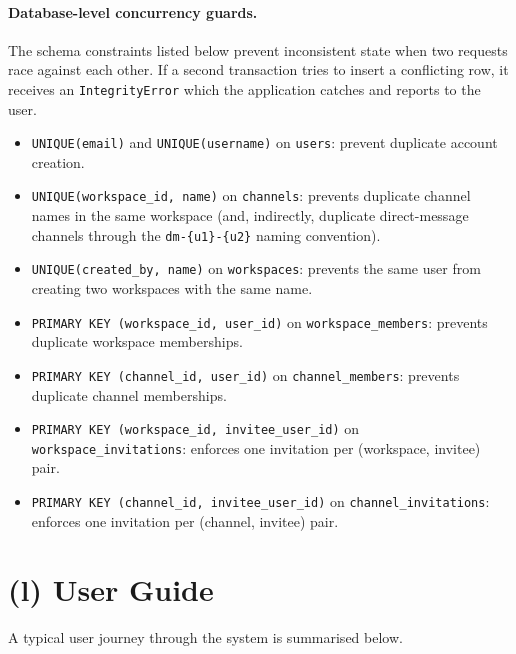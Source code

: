 \documentclass[11pt,letterpaper]{article}
\begin{document}
\paragraph{Database-level concurrency guards.} The schema constraints listed
below prevent inconsistent state when two requests race against each other.
If a second transaction tries to insert a conflicting row, it receives an
\texttt{IntegrityError} which the application catches and reports to the user.
\begin{itemize}[leftmargin=1.4em,itemsep=1pt]
  \item \texttt{UNIQUE(email)} and \texttt{UNIQUE(username)} on
        \texttt{users}: prevent duplicate account creation.
  \item \texttt{UNIQUE(workspace\_id, name)} on \texttt{channels}: prevents
        duplicate channel names in the same workspace (and, indirectly,
        duplicate direct-message channels through the
        \texttt{dm-\{u1\}-\{u2\}} naming convention).
  \item \texttt{UNIQUE(created\_by, name)} on \texttt{workspaces}: prevents
        the same user from creating two workspaces with the same name.
  \item \texttt{PRIMARY KEY (workspace\_id, user\_id)} on
        \texttt{workspace\_members}: prevents duplicate workspace memberships.
  \item \texttt{PRIMARY KEY (channel\_id, user\_id)} on
        \texttt{channel\_members}: prevents duplicate channel memberships.
  \item \texttt{PRIMARY KEY (workspace\_id, invitee\_user\_id)} on
        \texttt{workspace\_invitations}: enforces one invitation per
        (workspace, invitee) pair.
  \item \texttt{PRIMARY KEY (channel\_id, invitee\_user\_id)} on
        \texttt{channel\_invitations}: enforces one invitation per
        (channel, invitee) pair.
\end{itemize}

\section*{(l) User Guide}

A typical user journey through the system is summarised below.
\end{document}
